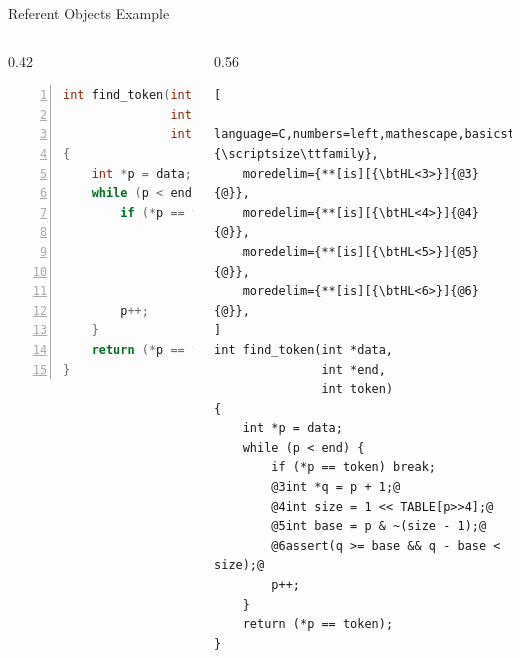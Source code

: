 \documentclass[aspectratio=169]{beamer}
\begin{document}
\begin{frame}[fragile]{Referent Objects Example}
\footnotesize
\begin{columns}[T]
\begin{column}{0.42\textwidth}
\begin{lstlisting}[language=C,numbers=left,mathescape,basicstyle={\scriptsize\ttfamily}]
int find_token(int *data,
               int *end,
               int token)
{
    int *p = data;
    while (p < end) {
        if (*p == token) break;




        p++;
    }
    return (*p == token);
}
\end{lstlisting}
\end{column}

\pause

\begin{column}{0.56\textwidth}
\begin{lstlisting}[
    language=C,numbers=left,mathescape,basicstyle={\scriptsize\ttfamily},
    moredelim={**[is][{\btHL<3>}]{@3}{@}},
    moredelim={**[is][{\btHL<4>}]{@4}{@}},
    moredelim={**[is][{\btHL<5>}]{@5}{@}},
    moredelim={**[is][{\btHL<6>}]{@6}{@}},
]
int find_token(int *data,
               int *end,
               int token)
{
    int *p = data;
    while (p < end) {
        if (*p == token) break;
        @3int *q = p + 1;@
        @4int size = 1 << TABLE[p>>4];@
        @5int base = p & ~(size - 1);@
        @6assert(q >= base && q - base < size);@
        p++;
    }
    return (*p == token);
}
\end{lstlisting}
\end{column}

\end{columns}
\end{frame}
\end{document}
